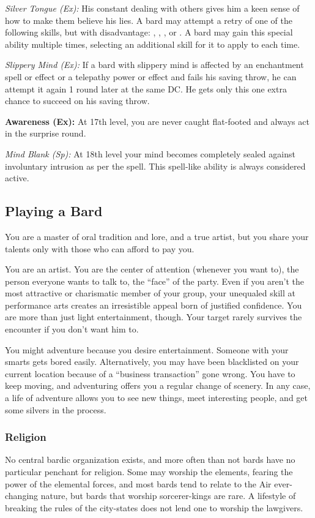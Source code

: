 \textit{Silver Tongue (Ex):} His constant dealing with others gives him a keen sense of how to make them believe his lies. A bard may attempt a retry of one of the following skills, but with disadvantage: , , , or . A bard may gain this special ability multiple times, selecting an additional skill for it to apply to each time.

\textit{Slippery Mind (Ex):} If a bard with slippery mind is affected by an enchantment spell or effect or a telepathy power or effect and fails his saving throw, he can attempt it again 1 round later at the same DC. He gets only this one extra chance to succeed on his saving throw.

\textbf{Awareness (Ex):} At 17th level, you are never caught flat-footed and always act in the surprise round.

\textit{Mind Blank (Sp):} At 18th level your mind becomes completely sealed against involuntary intrusion as per the  spell. This spell-like ability is always considered active.


\subsection{Playing a Bard}
You are a master of oral tradition and lore, and a true artist, but you share your talents only with those who can afford to pay you.

You are an artist. You are the center of attention (whenever you want to), the person everyone wants to talk to, the ``face'' of the party. Even if you aren't the most attractive or charismatic member of your group, your unequaled skill at performance arts creates an irresistible appeal born of justified confidence. You are more than just light entertainment, though. Your target rarely survives the encounter if you don't want him to.

You might adventure because you desire entertainment. Someone with your smarts gets bored easily. Alternatively, you may have been blacklisted on your current location because of a ``business transaction'' gone wrong. You have to keep moving, and adventuring offers you a regular change of scenery. In any case, a life of adventure allows you to see new things, meet interesting people, and get some silvers in the process.

\subsubsection{Religion}
No central bardic organization exists, and more often than not bards have no particular penchant for religion. Some may worship the elements, fearing the power of the elemental forces, and most bards tend to relate to the Air ever-changing nature, but bards that worship sorcerer-kings are rare. A lifestyle of breaking the rules of the city-states does not lend one to worship the lawgivers.


